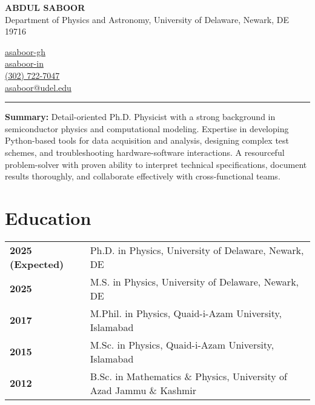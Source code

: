 \documentclass[letter,11pt]{article}
\begin{document}
\begin{minipage}{0.65\textwidth}
    \raggedright
    {\Large \textbf{ABDUL SABOOR}} \\ 
    Department of Physics and Astronomy, University of Delaware, Newark, DE 19716 
\end{minipage}
\hfill
\begin{minipage}{0.3\textwidth}
    \raggedright
    \faGithub \quad \href{https://github.com/asaboor-gh}{asaboor-gh}\\
    \faLinkedin \quad \href{https://linkedin.com/in/asaboor-in}{asaboor-in} \\
    \faPhone \quad \href{tel:+13027227047}{(302) 722-7047} \\
    \faEnvelope \quad \href{mailto:asaboor@udel.edu}{asaboor@udel.edu}
\end{minipage}
\vspace{2mm}
\hrule
\vspace{4mm} 

\noindent
\textbf{Summary:} Detail-oriented Ph.D. Physicist with a strong background in semiconductor physics and computational modeling. Expertise in developing Python-based tools for data acquisition and analysis, designing complex test schemes, and troubleshooting hardware-software interactions. A resourceful problem-solver with proven ability to interpret technical specifications, document results thoroughly, and collaborate effectively with cross-functional teams.

\section{Education}
\begin{tabular}{p{3.25cm} p{12cm}}
    \textbf{2025 (Expected)} & Ph.D. in Physics, University of Delaware, Newark, DE \\
    \textbf{2025} & M.S. in Physics, University of Delaware, Newark, DE \\
    \textbf{2017} & M.Phil. in Physics, Quaid-i-Azam University, Islamabad \\
    \textbf{2015} & M.Sc. in Physics, Quaid-i-Azam University, Islamabad \\
    \textbf{2012} & B.Sc. in Mathematics \& Physics, University of Azad Jammu \& Kashmir \\
\end{tabular}
\end{document}

